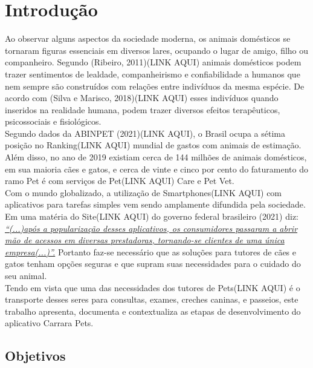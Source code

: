
\chapter[Introdução]{Introdução}
Ao observar alguns aspectos da sociedade moderna, os animais domésticos se tornaram figuras essenciais em diversos lares, ocupando o lugar de amigo, filho ou companheiro. Segundo (Ribeiro, 2011)(LINK AQUI) animais domésticos podem trazer sentimentos de lealdade, companheirismo e confiabilidade a humanos que nem sempre são construídos com relações entre indivíduos da mesma espécie. De acordo com (Silva e Marisco, 2018)(LINK AQUI) esses indivíduos quando inseridos na realidade humana, podem trazer diversos efeitos terapêuticos, psicossociais e fisiológicos. \\
 Segundo dados da ABINPET (2021)(LINK AQUI), o Brasil ocupa a sétima posição no Ranking(LINK AQUI) mundial de gastos com animais de estimação. Além disso, no ano de 2019 existiam cerca de 144 milhões de animais domésticos, em sua maioria cães e gatos, e cerca de vinte e cinco por cento do faturamento do ramo Pet é com serviços de Pet(LINK AQUI) Care e Pet Vet. \\
            Com o mundo globalizado, a utilização de Smartphones(LINK AQUI) com aplicativos para tarefas simples vem sendo amplamente difundida pela sociedade. \\
Em uma matéria do Site(LINK AQUI) do governo federal brasileiro (2021) diz: \underline{\textit{“(...)após a popularização desses aplicativos, os consumidores passaram a abrir mão de acessos em diversas prestadoras, tornando-se clientes de uma única empresa(...)”.}} Portanto faz-se necessário que as soluções para tutores de cães e gatos tenham opções seguras e que supram suas necessidades para o cuidado do seu animal. \\
 Tendo em vista que uma das necessidades dos tutores de Pets(LINK AQUI) é o transporte desses seres para consultas, exames, creches caninas, e passeios, este trabalho apresenta, documenta e contextualiza as etapas de desenvolvimento do aplicativo Carrara Pets.\\



\newpage
\section{Objetivos}

